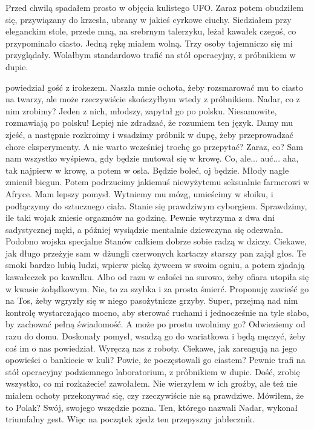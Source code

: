Przed chwilą spadałem prosto w objęcia kulistego UFO. Zaraz potem obudziłem się, przywiązany do krzesła, ubrany w jakieś cyrkowe ciuchy.
Siedziałem przy eleganckim stole, przede mną, na srebrnym talerzyku, leżał kawałek czegoś, co przypominało ciasto. Jedną rękę miałem wolną.
Trzy osoby tajemniczo się mi przyglądały. Wolałbym standardowo trafić na stół operacyjny, z próbnikiem w dupie.
\begin{dialogue}
\ds{}  \dm{} powiedział gość z irokezem. Naszła mnie ochota, żeby rozsmarować mu to ciasto na twarzy, ale może rzeczywiście skończyłbym wtedy z próbnikiem.
\ds{} Nadar, co z nim zrobimy? \dm{} Jeden z nich, młodszy, zapytał go po polsku. Niesamowite, rozmawiają po polsku! Lepiej nie zdradzać, że rozumiem ten język.
\ds{} Damy mu zjeść, a następnie rozkroimy i wsadzimy próbnik w dupę, żeby przeprowadzać chore eksperymenty.
\ds{} A nie warto wcześniej trochę go przepytać? Zaraz, co?
\ds{} Sam nam wszystko wyśpiewa, gdy będzie mutował się w krowę.
\ds{} Co, ale... auć... aha, tak najpierw w krowę, a potem w osła. Będzie boleć, oj będzie. \dm{} Młody nagle zmienił biegun.
\ds{} Potem podrzucimy jakiemuś niewyżytemu seksualnie farmerowi w Afryce.
\ds{} Mam lepszy pomysł. Wytniemy mu mózg, umieścimy w słoiku, i podłączymy do sztucznego ciała. Stanie się prawdziwym cyborgiem.
\ds{} Sprawdzimy, ile taki wojak zniesie orgazmów na godzinę. Pewnie wytrzyma z dwa dni sadystycznej męki, a później wysiądzie mentalnie \dm{} dziewczyna się odezwała.
\ds{} Podobno wojska specjalne Stanów całkiem dobrze sobie radzą w dziczy. Ciekawe, jak długo przeżyje sam w dżungli czerwonych kartaczy \dm{} starszy pan zajął głos. \dm{}
Te smoki bardzo lubią ludzi, wpierw pieką żywcem w swoim ogniu, a potem zjadają kawałeczek po kawałku.
\ds{} Albo od razu w całości na surowo, żeby ofiara utopiła się w kwasie żołądkowym.
\ds{} Nie, to za szybka i za prosta śmierć. Proponuję zawieść go na Tos, żeby wgryzły się w niego pasożytnicze grzyby.
\ds{} Super, przejmą nad nim kontrolę wystarczająco mocno, aby sterować ruchami i jednocześnie na tyle słabo, by zachować pełną świadomość.
\ds{} A może po prostu uwolnimy go? Odwieziemy od razu do domu.
\ds{} Doskonały pomysł, wsadzą go do wariatkowa i będą męczyć, żeby coś im o nas powiedział. Wyręczą nas z roboty. 
Ciekawe, jak zareagują na jego opowieści o bankiecie w kuli? Powie, że poczęstowali go ciastem?
\ds{} Pewnie trafi na stół operacyjny podziemnego laboratorium, z próbnikiem w dupie.
\ds{} Dość, zrobię wszystko, co mi rozkażecie! \dm{} zawołałem. Nie wierzyłem w ich groźby, ale też nie miałem ochoty przekonywać się, czy rzeczywiście nie są prawdziwe.
\ds{} Mówiłem, że to Polak? Swój, swojego wszędzie pozna. \dm{} Ten, którego nazwali Nadar, wykonał triumfalny gest. \dm{} Więc na początek zjedz ten przepyszny jabłecznik.
\end{dialogue}

